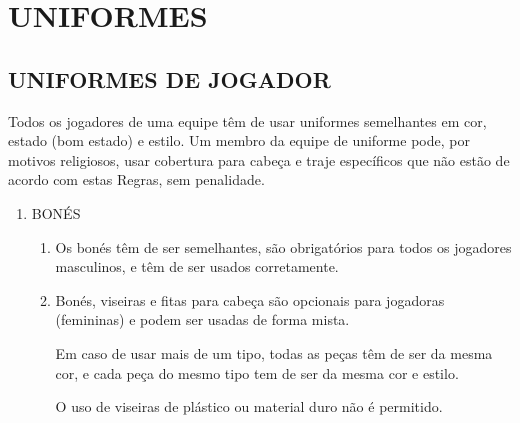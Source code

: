 	\section{UNIFORMES} 
	\begin{multicols}{2}
	\subsection{UNIFORMES DE JOGADOR} \label{sec:Uniformes}
	Todos os jogadores de uma equipe t\^em de usar uniformes semelhantes em cor, estado (bom estado) e estilo. Um membro da equipe de uniforme pode, por motivos religiosos, usar cobertura para cabe\c{c}a e traje espec\'ificos que n\~ao est\~ao de acordo com estas Regras, sem penalidade. 
	
	\begin{enumerate}[label=\alph*)]
		\item BON\'ES \label{item:Bone}
		\begin{enumerate}[label=\roman* -]
			\item Os bon\'es t\^em de ser semelhantes, s\~ao obrigat\'orios para todos os jogadores masculinos, e t\^em de ser usados corretamente. 
			\item Bon\'es, viseiras e fitas para cabe\c{c}a s\~ao opcionais para jogadoras (femininas) e podem ser usadas de forma mista. 
			
			Em caso de usar mais de um tipo, todas as pe\c{c}as t\^em de ser da mesma cor, e cada pe\c{c}a do mesmo tipo tem de ser da mesma cor e estilo. 
			
			O uso de viseiras de pl\'astico ou material duro n\~ao \'e permitido. 
			

\end{enumerate}
\end{enumerate}
\end{multicols}
